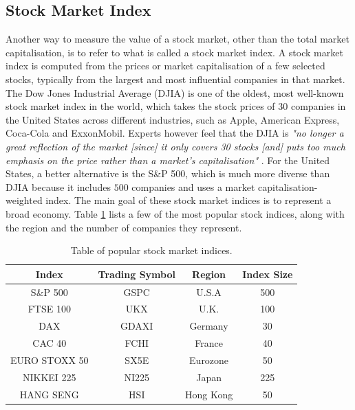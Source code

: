 \documentclass{UoYCSproject}
\begin{document}
\subsection{Stock Market Index}
Another way to measure the value of a stock market, other than the total market capitalisation, is to refer to what is called a stock market index. A stock market index is computed from the prices or market capitalisation of a few selected stocks, typically from the largest and most influential companies in that market. The Dow Jones Industrial Average (DJIA) is one of the oldest, most well-known stock market index in the world, which takes the stock prices of 30 companies in the United States across different industries, such as Apple, American Express, Coca-Cola and ExxonMobil. Experts however feel that the DJIA is \textit{"no longer a great reflection of the market [since] it only covers 30 stocks [and] puts too much emphasis on the price rather than a market's capitalisation"} \cite{dowproblem}. For the United States, a better alternative is the S\&P 500, which is much more diverse than DJIA because it includes $500$ companies and uses a market capitalisation-weighted index. The main goal of these stock market indices is to represent a broad economy. Table \ref{tab:indices} lists a few of the most popular stock indices, along with the region and the number of companies they represent. 

\begin{table}[h]
    \centering
    \begin{tabular}{|c|c|c|c|} \hline
        \textbf{Index} & \textbf{Trading Symbol} & \textbf{Region} & \textbf{Index Size} \\ \hline
        S\&P 500 & GSPC & U.S.A & 500 \\
        FTSE 100 & UKX & U.K. & 100 \\
        DAX & GDAXI & Germany & 30 \\
        CAC 40 & FCHI & France & 40 \\
        EURO STOXX 50 & SX5E & Eurozone & 50 \\
        NIKKEI 225 & NI225 & Japan & 225 \\
        HANG SENG & HSI & Hong Kong & 50 \\
        \hline
    \end{tabular}
    \caption{Table of popular stock market indices.}
    \label{tab:indices}
\end{table}
\end{document}
